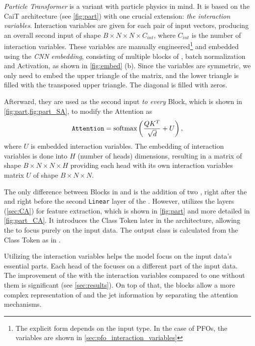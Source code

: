 \emph{Particle Transformer} \cite{part} is a \trans variant with particle physics in mind.
It is based on the CaiT \cite{cait} architecture (see \cref{fig:part}) with one crucial extension: \emph{the interaction variables}.
Interaction variables are given for each pair of input vectors, producing an overall second input of shape $B \times N \times N \times C_{int}$, where $C_{int}$ is the number of interaction variables.
These variables are manually engineered\footnote{The explicit form depends on the input type. In the case of PFOs, the variables are shown in \cref{sec:pfo_interaction_variables}} and embedded using the \emph{CNN embedding}, consisting of multiple blocks of \pointCNN, batch normalization and Activation, as shown in \cref{fig:embed} (b).
Since the variables are symmetric, we only need to embed the upper triangle of the matrix, and the lower triangle is filled with the transposed upper triangle.
The diagonal is filled with zeros.

Afterward, they are used as the second input \emph{to every} \SA Block, which is shown in \cref{fig:part,fig:part_SA}, to modify the Attention as
\begin{equation}
    \label{eq:attn_mod}
    \text{\texttt{Attention}} = \text{softmax}\left(\frac{QK^T}{\sqrt{d}} + U\right),
\end{equation}
where $U$ is embedded interaction variables.
The \pointCNN embedding of interaction variables is done into $H$ (number of heads) dimensions, resulting in a matrix of shape $B \times N \times N \times H$ providing each head with its own interaction variables matrix $U$ of shape $B \times N \times N$.

The only difference between \SA Blocks in \trans and \ParT is the addition of two \LN, right after the \MHSA and right before the second \texttt{Linear} layer of the \FFN.
However, \ParT utilizes the \CA layers (\cref{sec:CA}) for feature extraction, which is shown in \cref{fig:part} and more detailed in \cref{fig:part_CA}.
It introduces the Class Token later in the architecture, allowing the \MHSA to focus purely on the input data.
The output class is calculated from the Class Token as in \trans.

Utilizing the interaction variables helps the model focus on the input data's essential parts.
Each head of the \MHSA focuses on a different part of the input data.
The improvement of the \ParT with the interaction variables compared to one without them is significant \cite{part} (see \cref{sec:results}).
On top of that, the \CA blocks allow a more complex representation of \PFOs and the jet information by separating the attention mechanisms.

